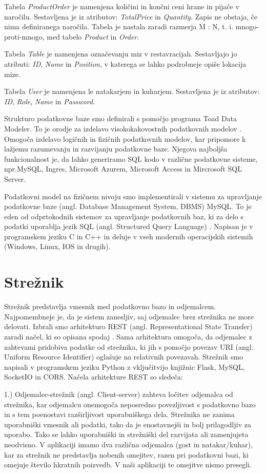 \documentclass[a4paper, 12pt]{book}
\begin{document}
Tabela \textit{ProductOrder} je namenjena količini in končni ceni hrane in pijače v naročilu. Sestavljena je iz atributov: \textit{TotalPrice} in \textit{Quantity}. Zapis ne obstaja, če nima definiranega naročila. Tabela je nastala zaradi razmerja M : N, t. i. mnogo-proti-mnogo, med tabelo \textit{Product} in \textit{Order}.

Tabela \textit{Table} je namenjena označevanju miz v restavracijah. Sestavljajo jo atributi: \textit{ID}, \textit{Name} in \textit{Position}, v katerega se lahko podrobneje opiše lokacija mize.

Tabela \textit{User} je namenjena le natakarjem in kuharjem. Sestavljena je iz atributov: \textit{ID}, \textit{Role}, \textit{Name} in \textit{Password}. 

Strukturo podatkovne baze smo definirali s pomočjo programa Toad Data Modeler. To je orodje za izdelavo visokokakovostnih podatkovnih modelov \cite{Toad_Data_Modeler}. Omogoča izdelavo logičnih in fizičnih podatkovnih modelov, kar pripomore k lažjemu razumevanju in razvijanju podatkovne baze. Njegova najboljša funkcionalnost je, da lahko generiramo SQL kodo v različne podatkovne sisteme, npr.MySQL, Ingres, Microsoft Azurem, Microsoft Access in Mircrosoft SQL Server.

Podatkovni model na fizičnem nivoju smo implementirali v sistemu za upravljanje podatkovne baze (angl. Database Management System, DBMS) MySQL. To je eden od odprtokodnih sistemov za upravljanje podatkovnih baz, ki za delo s podatki uporablja jezik SQL (angl. Structured Query Language) \cite{MySQL}. Napisan je v programskem jeziku C in C++ in deluje v vseh modernih operacijskih sistemih (Windows, Linux, IOS in drugih).


\section{Strežnik}
Strežnik predstavlja vmesnik med podatkovno bazo in odjemalcem. Najpomembneje je, da je sistem zanesljiv, saj odjemalec brez strežnika ne more delovati. Izbrali smo arhitekturo REST (angl. Representational State Transfer) zaradi načel, ki so opisana spodaj \cite{RESTAPI}. Sama arhitektura omogoča, da odjemalec z zahtevami pridobiva podatke od strežnika, ki jih s pomočjo povezav URI (angl. Uniform Resource Identifier) oglašuje na relativnih povezavah. Strežnik smo napisali v programskem jeziku Python z vključitvijo knjižnic Flask, MySQL, SocketIO in CORS. Načela arhitekture REST so sledeča:

1.) Odjemalec-strežnik (angl. Client-server) zahteva ločitev odjemalca od strežnika, kar odjemalcu onemogoča neposredno povezljivost s podatkovno bazo in s tem poenostavi razširljivost uporabniškega dela. Strežnika ne zanima uporabniški vmesnik ali podatki, tako da je enostavnejši in bolj prilagodljiv za uporabo. Tako se lahko uporabniški in strežniški del razvijata ali zamenjujeta neodvisno. V aplikaciji imamo dva različna odjemalca (gost in natakar/kuhar), kar za strežnik ne predstavlja nobenih omejitev, razen pri podatkovni bazi, ki omejuje število hkratnih poizvedb. V naši aplikaciji te omejitve nismo presegli.
\end{document}
